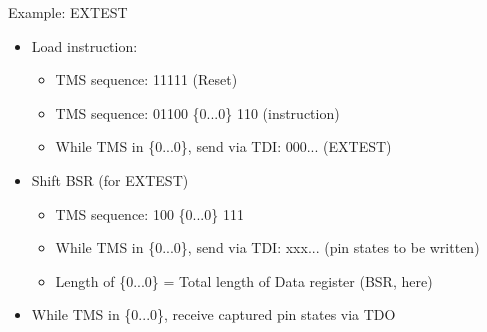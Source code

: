 \documentclass{beamer}
\begin{document}
\begin{frame}{Example: EXTEST}
    \begin{itemize}
    \item Load instruction:
        \begin{itemize}
        \item TMS sequence: 11111 (Reset)
        \item TMS sequence: 01100 \{0...0\} 110 (instruction)
        \item While TMS in \{0...0\}, send via TDI: 000... (EXTEST)
        \end{itemize}
    \item Shift BSR (for EXTEST)
        \begin{itemize}
        \item TMS sequence: 100 \{0...0\} 111
        \item While TMS in \{0...0\}, send via TDI: xxx... (pin states to be written)
        \item Length of \{0...0\} = Total length of Data register (BSR, here)
        \end{itemize}
    \item While TMS in \{0...0\}, receive captured pin states via TDO
    \end{itemize}
\end{frame}
\end{document}
